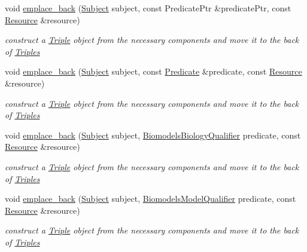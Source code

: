 \begin{DoxyCompactItemize}
void \hyperlink{classomexmeta_1_1Triples_a9882f6f582e8d2e34e09d2f7076a0e2e}{emplace\+\_\+back} (\hyperlink{classomexmeta_1_1Subject}{Subject} subject, const Predicate\+Ptr \&predicate\+Ptr, const \hyperlink{classomexmeta_1_1Resource}{Resource} \&resource)
\begin{DoxyCompactList}\small\item\em construct a \hyperlink{classomexmeta_1_1Triple}{Triple} object from the necessary components and move it to the back of \hyperlink{classomexmeta_1_1Triples}{Triples} \end{DoxyCompactList}\item 
void \hyperlink{classomexmeta_1_1Triples_acab4513889a9a42c77b3044aac941728}{emplace\+\_\+back} (\hyperlink{classomexmeta_1_1Subject}{Subject} subject, const \hyperlink{classomexmeta_1_1Predicate}{Predicate} \&predicate, const \hyperlink{classomexmeta_1_1Resource}{Resource} \&resource)
\begin{DoxyCompactList}\small\item\em construct a \hyperlink{classomexmeta_1_1Triple}{Triple} object from the necessary components and move it to the back of \hyperlink{classomexmeta_1_1Triples}{Triples} \end{DoxyCompactList}\item 
void \hyperlink{classomexmeta_1_1Triples_a862d672c0ac9d877261947cf5a7061db}{emplace\+\_\+back} (\hyperlink{classomexmeta_1_1Subject}{Subject} subject, \hyperlink{classomexmeta_1_1BiomodelsBiologyQualifier}{Biomodels\+Biology\+Qualifier} predicate, const \hyperlink{classomexmeta_1_1Resource}{Resource} \&resource)
\begin{DoxyCompactList}\small\item\em construct a \hyperlink{classomexmeta_1_1Triple}{Triple} object from the necessary components and move it to the back of \hyperlink{classomexmeta_1_1Triples}{Triples} \end{DoxyCompactList}\item 
void \hyperlink{classomexmeta_1_1Triples_a87cdc3aacef07c2aebbfe06342bd70f5}{emplace\+\_\+back} (\hyperlink{classomexmeta_1_1Subject}{Subject} subject, \hyperlink{classomexmeta_1_1BiomodelsModelQualifier}{Biomodels\+Model\+Qualifier} predicate, const \hyperlink{classomexmeta_1_1Resource}{Resource} \&resource)
\begin{DoxyCompactList}\small\item\em construct a \hyperlink{classomexmeta_1_1Triple}{Triple} object from the necessary components and move it to the back of \hyperlink{classomexmeta_1_1Triples}{Triples} \end{DoxyCompactList}\item 

\end{DoxyCompactItemize}
